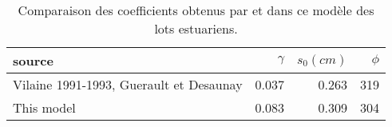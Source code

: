 \begin{table}[htbp]
\centering
\caption{Comparaison des coefficients obtenus par \citet{desaunay_seasonal_1997} et dans ce modèle des lots estuariens.} 
\label{resumé_cyclique}
\begin{tabularx}{0.6\textwidth}{lrrr}
  \hline
source & $\gamma$ & $s_0(cm)$ & $\phi$ \\ 
  \hline
Vilaine 1991-1993, Guerault et Desaunay & 0.037 & 0.263 & 319 \\ 
  This model & 0.083 & 0.309 & 304 \\ 
   \hline
\end{tabularx}
\end{table}
